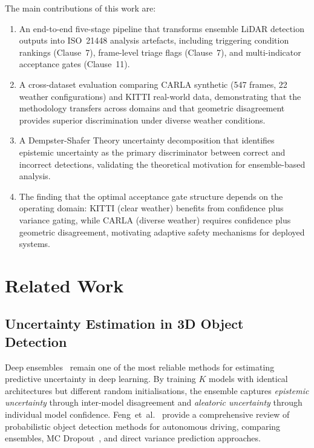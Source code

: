 \documentclass[conference]{IEEEtran}
\begin{document}
The main contributions of this work are:
\begin{enumerate}
    \item An end-to-end five-stage pipeline that transforms ensemble LiDAR detection outputs into ISO~21448 analysis artefacts, including triggering condition rankings (Clause~7), frame-level triage flags (Clause~7), and multi-indicator acceptance gates (Clause~11).
    \item A cross-dataset evaluation comparing CARLA synthetic (547 frames, 22 weather configurations) and KITTI real-world data, demonstrating that the methodology transfers across domains and that geometric disagreement provides superior discrimination under diverse weather conditions.
    \item A Dempster-Shafer Theory uncertainty decomposition that identifies epistemic uncertainty as the primary discriminator between correct and incorrect detections, validating the theoretical motivation for ensemble-based analysis.
    \item The finding that the optimal acceptance gate structure depends on the operating domain: KITTI (clear weather) benefits from confidence plus variance gating, while CARLA (diverse weather) requires confidence plus geometric disagreement, motivating adaptive safety mechanisms for deployed systems.
\end{enumerate}


\section{Related Work}

\subsection{Uncertainty Estimation in 3D Object Detection}

Deep ensembles~\cite{lakshminarayanan2017} remain one of the most reliable methods for estimating predictive uncertainty in deep learning. By training $K$ models with identical architectures but different random initialisations, the ensemble captures \emph{epistemic uncertainty} through inter-model disagreement and \emph{aleatoric uncertainty} through individual model confidence. Feng~et~al.~\cite{feng2021} provide a comprehensive review of probabilistic object detection methods for autonomous driving, comparing ensembles, MC Dropout~\cite{gal2016}, and direct variance prediction approaches.
\end{document}
